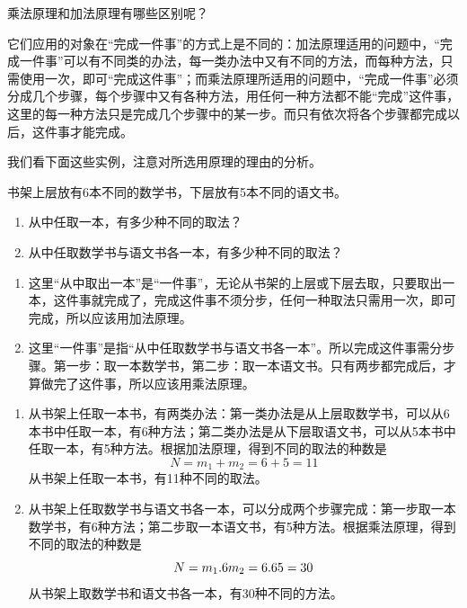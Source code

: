 乘法原理和加法原理有哪些区别呢？

它们应用的对象在“完成一件事”的方式上是不同的：加法原理适用的问题中，“完成一件事”可以有不同类的办法，每一类办法中又有不同的方法，而每种方法，只需使用一次，即可“完成这件事”；而乘法原理所适用的问题中，“完成一件事”必须分成几个步骤，每个步骤中又有各种方法，用任何一种方法都不能“完成”这件事，这里的每一种方法只是完成几个步骤中的某一步。而只有依次将各个步骤都完成以后，这件事才能完成。

我们看下面这些实例，注意对所选用原理的理由的分析。

\begin{example}
    书架上层放有6本不同的数学书，下层放有5本不同的语文书。
\begin{enumerate}[(1)]
    \item 从中任取一本，有多少种不同的取法？
    \item 从中任取数学书与语文书各一本，有多少种不同的取法？
\end{enumerate}
\end{example}

\begin{analyze}
\begin{enumerate}[(1)]
    \item 这里“从中取出一本”是“一件事”，无论从书架的上层或下层去取，只要取出一本，这件事就完成了，完成这件事不须分步，任何一种取法只需用一次，即可完成，所以应该用加法原理。
    \item 这里“一件事”是指“从中任取数学书与语文书各一本”。所以完成这件事需分步骤。第一步：取一本数学书，第二步：取一本语文书。只有两步都完成后，才算做完了这件事，所以应该用乘法原理。
\end{enumerate}
\end{analyze}

\begin{solution}
\begin{enumerate}[(1)]
    \item 从书架上任取一本书，有两类办法：第一类办法是从上层取数学书，可以从6本书中任取一本，有6种方法；第二类办法是从下层取语文书，可以从5本书中任取一本，有5种方法。根据加法原理，得到不同的取法的种数是
\[N=m_{1}+m_{2}=6+5=11\]
从书架上任取一本书，有11种不同的取法。
\item 从书架上任取数学书与语文书各一本，可以分成两个步骤完成：第一步取一本数学书，有6种方法；第二步取一本语文书，有5种方法。根据乘法原理，得到不同的取法的种数是
\[N=m_{1}.6 m_{2}=6.6 5=30\]
从书架上取数学书和语文书各一本，有30种不同的方法。
\end{enumerate}
\end{solution}


